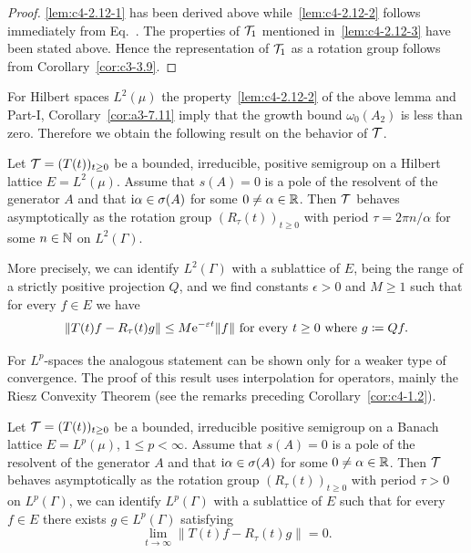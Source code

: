 \begin{proof}
\ref{lem:c4-2.12-1} has been derived above while~\ref{lem:c4-2.12-2} follows immediately from Eq.~.
The properties of\/ $\mathcal{T}_{1}$ mentioned in~\ref{lem:c4-2.12-3} have been stated above.
Hence the representation of\/ $\mathcal{T}_{1}$ as a rotation group follows from Corollary~\ref{cor:c3-3.9}.
\end{proof}
For Hilbert spaces $L^{2}(\mu)$ the property~\ref{lem:c4-2.12-2} of the above lemma and Part-I, Corollary~\ref{cor:a3-7.11} imply that the growth bound $\omega_{0}(A_{2})$ is less than zero.
Therefore we obtain the following result on the behavior of\/ $\mathcal{T}$.
\begin{proposition}\label{prop:c4-2.13}
Let $\TT = (T(t))_{t\geq 0}$ be a bounded, irreducible, positive semigroup on a Hilbert lattice $E = L^{2}(\mu)$.
Assume that $s(A) = 0$ is a pole of the resolvent of the generator $A$ and that $\mathrm{i}\alpha \in \sigma(A)$ for some $0 \neq \alpha \in \mathbb{R}$.
Then $\mathcal{T}$ behaves asymptotically as the rotation group $(R_{\tau}(t))_{t \geq 0}$ with period $\tau = 2\pi n/\alpha$ for some $n \in \mathbb{N}$ on $L^{2}(\Gamma)$.

More precisely, we can identify $L^{2}(\Gamma)$ with a sublattice of\/ $E$, being the range of a strictly positive projection $Q$, and we find constants $\epsilon > 0$ and $M \geq 1$ such that for every $f \in E$ we have
\begin{equation}\label{eq:c4-2.11}
\|T(t)f - R_{\tau}(t)g\| \leq M\eu^{-\epsilon t}\|f\| \text{ for every } t \geq 0 \text{ where } g \coloneqq Qf.
\end{equation}
\end{proposition}
For $L^{p}$-spaces the analogous statement can be shown only for a weaker type of convergence.
The proof of this result uses interpolation for operators, mainly the Riesz Convexity Theorem (see the remarks preceding Corollary~\ref{cor:c4-1.2}).
\begin{theorem}\label{thm:c4-2.14}
%
%
%
Let $\TT = (T(t))_{t \geq 0}$ be a bounded, irreducible positive semigroup on a Banach lattice $E = L^{p}(\mu)$, $1 \leq p < \infty$.
Assume that $s(A) = 0$ is a pole of the resolvent of the generator $A$ and that $\mathrm{i}\alpha \in \sigma(A)$ for some $0 \neq \alpha \in \mathbb{R}$.
Then $\mathcal{T}$ behaves asymptotically as the rotation group $(R_{\tau}(t))_{t \geq 0}$ with period $\tau > 0$ on $L^{p}(\Gamma)$, \ie  we can identify $L^{p}(\Gamma)$ with a sublattice of\/ $E$ such that for every $f \in E$ there exists $g \in L^{p}(\Gamma)$ satisfying
\begin{equation}\label{eq:c4-2.12}
\lim_{t \to \infty} \|T(t)f - R_{\tau}(t)g\| = 0.
\end{equation}
\end{theorem}
